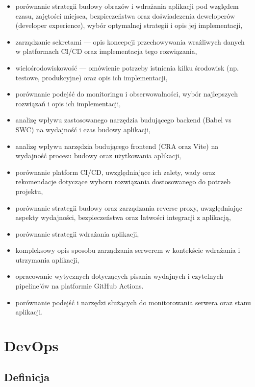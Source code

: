 \documentclass{article}
\begin{document}
\begin{itemize}
    \item porównanie strategii budowy obrazów i wdrażania aplikacji pod względem czasu, zajętości miejsca, bezpieczeństwa oraz doświadczenia deweloperów (developer experience), wybór optymalnej strategii i opis jej implementacji,
    \item zarządzanie sekretami — opis koncepcji przechowywania wrażliwych danych w platformach CI/CD oraz implementacja tego rozwiązania,
    \item wielośrodowiskowość — omówienie potrzeby istnienia kilku środowisk (np. testowe, produkcyjne) oraz opis ich implementacji,
    \item porównanie podejść do monitoringu i obserwowalności, wybór najlepszych rozwiązań i opis ich implementacji,
    \item analizę wpływu zastosowanego narzędzia budującego backend (Babel vs SWC) na wydajność i czas budowy aplikacji,
    \item analizę wpływu narzędzia budującego frontend (CRA oraz Vite) na wydajność procesu budowy oraz użytkowania aplikacji,
    \item porównanie platform CI/CD, uwzględniające ich zalety, wady oraz rekomendacje dotyczące wyboru rozwiązania dostosowanego do potrzeb projektu,
    \item porównanie strategii budowy oraz zarządzania reverse proxy, uwzględniając aspekty wydajności, bezpieczeństwa oraz łatwości integracji z aplikacją,
    \item porównanie strategii wdrażania aplikacji,
    \item kompleksowy opis sposobu zarządzania serwerem w kontekście wdrażania i utrzymania aplikacji,
    \item opracowanie wytycznych dotyczących pisania wydajnych i czytelnych pipeline’ów na platformie GitHub Actions.
    \item porównanie podejść i narzędzi służących do monitorowania serwera oraz stanu aplikacji.
\end{itemize}

\section {DevOps}

\subsection{Definicja}
\end{document}
